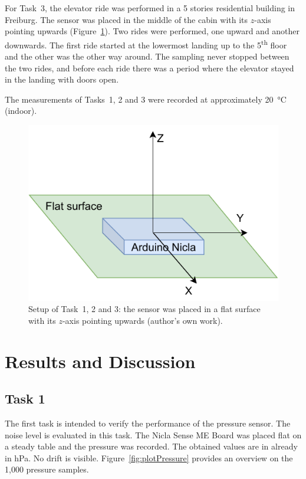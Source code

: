 \documentclass[DIV=14]{scrartcl}
\begin{document}
    For Task~3, the elevator ride was performed in a 5 stories residential building in Freiburg.
    The sensor was placed in the middle of the cabin with its $z$-axis pointing upwards (Figure~\ref{fig:setup}).
    Two rides were performed, one upward and another downwards.
    The first ride started at the lowermost landing up to the 5\textsuperscript{th} floor and the other was the
    other way around.
    The sampling never stopped between the two rides, and before each ride there was a period where the elevator
    stayed in the landing with doors open.

    The measurements of Tasks~1, 2 and 3 were recorded at approximately \SI{20}{\celsius} (indoor).

    \vspace{3em}

    \begin{figure}[h]
        \centering
        \includegraphics[width=.6\textwidth]{figures/Setup1and2}
        \caption{Setup of Task~1, 2 and 3: the sensor was placed in a flat surface with its $z$-axis pointing upwards
            (author's own work).}
        \label{fig:setup}
    \end{figure}

    \clearpage


    \section{Results and Discussion}

    \subsection*{Task 1}

    The first task is intended to verify the performance of the pressure sensor.
    The noise level is evaluated in this task.
    The Nicla Sense ME Board was placed flat on a steady table and the pressure was recorded.
    The obtained values are in already in \si{\hecto\pascal}.
    No drift is visible.
    Figure~\ref{fig:plotPressure} provides an overview on the 1,000 pressure samples.
\end{document}
